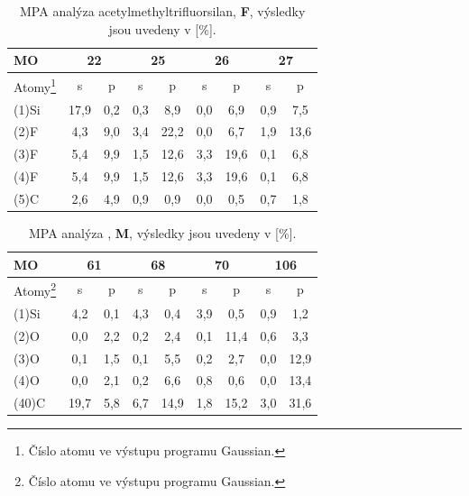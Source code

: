 \documentclass[
  digital, %
  table,   %
  lof,     %
  lot,     %
  oneside,
]{fithesis3}
\begin{document}
\begin{table}[htbp] \begin{minipage}{\textwidth}
\caption{MPA analýza acetylmethyltrifluorsilan, \textbf{F}, výsledky jsou uvedeny v [\%].}
\begin{center}
\begin{tabular}{|l|c|c|c|c|c|c|c|c|}
\hline
\label{acetylmethyltrifluorsilan_MPA} MO &   \multicolumn{2}{c|}{22} &  \multicolumn{2}{c|}{25} &   \multicolumn{2}{c|}{26} &  \multicolumn{2}{c|}{27} \\ \hline
Atomy\footnote{Číslo atomu ve výstupu programu Gaussian.} & s & p & s & p & s & p & s & p \\ \hline
(1)Si & 17,9  & 0,2  & 0,3  & 8,9  & 0,0  & 6,9  & 0,9  & 7,5  \\ \hline
(2)F & 4,3  & 9,0  & 3,4  & 22,2  & 0,0  & 6,7  & 1,9  & 13,6  \\ \hline
(3)F & 5,4  & 9,9  & 1,5  & 12,6  & 3,3  & 19,6  & 0,1  & 6,8  \\ \hline
(4)F & 5,4  & 9,9  & 1,5  & 12,6  & 3,3  & 19,6  & 0,1  & 6,8  \\ \hline
(5)C & 2,6  & 4,9  & 0,9  & 0,9  & 0,0  & 0,5  & 0,7  & 1,8  \\ \hline
\end{tabular}
\end{center}\end{minipage}
\end{table}


\begin{table}[htbp]\begin{minipage}{\textwidth}
\caption{MPA analýza , \textbf{M}, výsledky jsou uvedeny v [\%].}
\begin{center}
\begin{tabular}{|l|c|c|c|c|c|c|c|c|}
\hline
 \label{si_model_methyl_MPA} MO& \multicolumn{2}{c|}{61} &   \multicolumn{2}{c|}{68}  & \multicolumn{2}{c|}{70} &  \multicolumn{2}{c|}{106} \\ \hline
  Atomy\footnote{Číslo atomu ve výstupu programu Gaussian.}& s & p & s & p & s & p & s & p \\ \hline
(1)Si  & 4,2  & 0,1  & 4,3  & 0,4  & 3,9  & 0,5  & 0,9  & 1,2  \\ \hline
(2)O & 0,0  & 2,2  & 0,2  & 2,4  & 0,1  & 11,4  & 0,6  & 3,3  \\ \hline
(3)O & 0,1  & 1,5  & 0,1  & 5,5  & 0,2  & 2,7  & 0,0  & 12,9  \\ \hline
(4)O & 0,0  & 2,1  & 0,2  & 6,6  & 0,8  & 0,6  & 0,0  & 13,4  \\ \hline
(40)C & 19,7  & 5,8  & 6,7  & 14,9  & 1,8  & 15,2  & 3,0  & 31,6  \\ \hline
\end{tabular}
\end{center}\end{minipage}\end{table}
\end{document}
